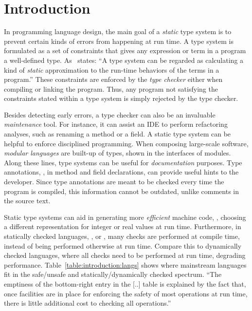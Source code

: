 \chapter{Introduction}

In programming language design, the main goal of a \emph{static} type system is to prevent certain kinds of errors from happening at run time.
A type system is formulated as a set of constraints that gives any expression or term in a program a well-defined type.
As~\cite{pierceTypesProgrammingLanguages2002} states:
``A type system can be regarded as calculating a kind of \emph{static} approximation to the run-time behaviors of the terms in a program.''
These constraints are enforced by the \emph{type checker} either when compiling or linking the program.
Thus, any program not satisfying the constraints stated within a type system is simply rejected by the type checker.

Besides detecting early errors,
a type checker can also be an invaluable \emph{maintenance} tool.
For instance, it can assist an IDE to perform refactoring analyses,
such as renaming a method or a field.
A static type system can be helpful to enforce disciplined programming.
When composing large-scale software,
\emph{modular languages} are built-up of types,
shown in the interfaces of modules.
Along these lines,
type systems can be useful for \emph{documentation} purposes.
Type annotations, \eg{}, in method and field declarations,
can provide useful hints to the developer.
Since type annotations are meant to be checked every time the program is compiled,
this information cannot be outdated, unlike comments in the source text.

Static type systems can aid in generating more \emph{efficient} machine code, \eg{},
choosing a different representation for integer or real values at run time.
Furthermore, in statically checked languages, \eg{}, \java{} or \rust{},
many checks are performed at compile time,
instead of being performed otherwise at run time.
Compare this to dynamically checked languages,
where all checks need to be performed at run time,
degrading performance.
Table~\ref{table:introduction:langs} shows where mainstream languages fit in the safe/unsafe and statically/dynamically checked spectrum.
``The emptiness of the bottom-right entry in the [..] table is explained by the fact that,
once facilities are in place for enforcing the safety of most operations at run time,
there is little additional cost to checking all operations.''~\citep{pierceTypesProgrammingLanguages2002}


